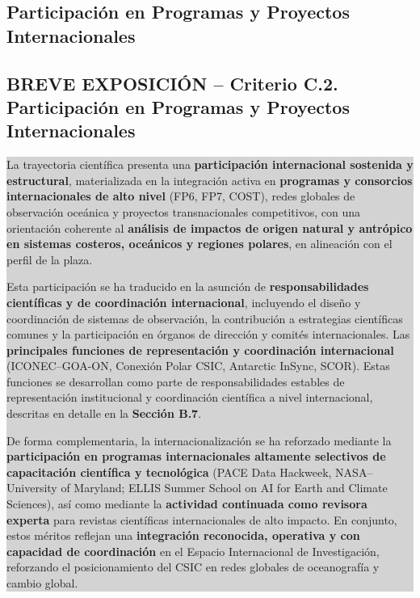 \documentclass[11pt,a4paper]{article}
\newcommand{\breveexposicion}[2]{
    \subsection*{\color{darkgray}\textbf{BREVE EXPOSICIÓN -- #1}}
    \vspace{0.3em}
    \noindent\colorbox{lightgray}{%
        \begin{minipage}{0.97\textwidth}
        \vspace{0.5em}
        \color{darkgray}
        #2
        \vspace{0.5em}
        \end{minipage}
    }
    \vspace{1em}
}
\begin{document}
\subsection{Participación en Programas y Proyectos Internacionales}

\breveexposicion{Criterio C.2. Participación en Programas y Proyectos Internacionales}{
La trayectoria científica presenta una \textbf{participación internacional sostenida y estructural}, materializada en la integración activa en \textbf{programas y consorcios internacionales de alto nivel} (FP6, FP7, COST), redes globales de observación oceánica y proyectos transnacionales competitivos, con una orientación coherente al \textbf{análisis de impactos de origen natural y antrópico en sistemas costeros, oceánicos y regiones polares}, en alineación con el perfil de la plaza.

Esta participación se ha traducido en la asunción de \textbf{responsabilidades científicas y de coordinación internacional}, incluyendo el diseño y coordinación de sistemas de observación, la contribución a estrategias científicas comunes y la participación en órganos de dirección y comités internacionales. Las \textbf{principales funciones de representación y coordinación internacional} (ICONEC--GOA-ON, Conexión Polar CSIC, Antarctic InSync, SCOR). Estas funciones se desarrollan como parte de responsabilidades estables de representación institucional y coordinación científica a nivel internacional, descritas en detalle en la \textbf{Sección B.7}.

De forma complementaria, la internacionalización se ha reforzado mediante la \textbf{participación en programas internacionales altamente selectivos de capacitación científica y tecnológica} (PACE Data Hackweek, NASA–University of Maryland; ELLIS Summer School on AI for Earth and Climate Sciences), así como mediante la \textbf{actividad continuada como revisora experta} para revistas científicas internacionales de alto impacto. En conjunto, estos méritos reflejan una \textbf{integración reconocida, operativa y con capacidad de coordinación} en el Espacio Internacional de Investigación, reforzando el posicionamiento del CSIC en redes globales de oceanografía y cambio global.
}
\end{document}
